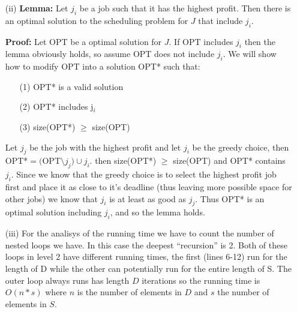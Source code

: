 \documentclass{article}
\begin{document}
\begin{itemize}
\begin{itemize}
\item[(ii)]
\textbf{Lemma:}
Let $j_i$ be a job such that it has the highest profit. Then there is an optimal solution to the scheduling problem for $J$ that include $j_i$.


\textbf{Proof:} Let OPT be a optimal solution for $J$. If OPT includes $j_i$ then the lemma obviously holds, so assume OPT does not include $j_i$. We will show how to modify OPT into a solution OPT* such that:

\begin{itemize}
\item[(1)] OPT* is a valid solution
\item[(2)] OPT* includes j$_i$
\item[(3)] size(OPT*) $\ge$ size(OPT) 
\end{itemize}


Let $j_j$ be the job with the highest profit and let $j_i$ be the greedy choice, then OPT*$=($OPT$\setminus j_j) \cup j_i$. then size(OPT*) $\ge$ size(OPT) and OPT* contains $j_i$. Since we know that the greedy choice is to select the highest profit job first and place it as close to it's deadline (thus leaving more possible space for other jobs) we know that $j_i$ is at least as good as $j_j$.
Thus OPT* is an optimal solution including $j_i$, and so the lemma holds.

\item[(iii)]
For the analisys of the running time we have to count the number of nested loops we have. In this case the deepest ``recursion'' is 2. Both of these loops in level 2 have different running times, the first (lines 6-12) run for the length of D while the other can potentially run for the entire length of S. The outer loop always runs has length $D$ iterations so the running time is $O(n*s)$ where $n$ is the number of elements in $D$ and $s$ the number of elements in $S$.

\end{itemize}
\end{itemize}
\end{document}
